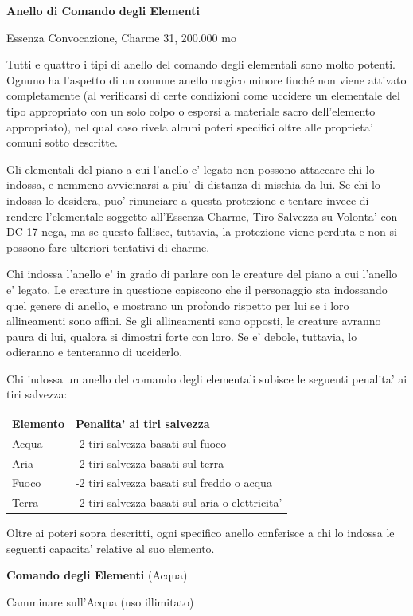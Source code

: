 \documentclass[a4paper,11pt,twoside,openany]{book}
\begin{document}
{\textbf{Anello di Comando degli Elementi}

Essenza Convocazione, Charme 31, 200.000 mo

Tutti e quattro i tipi di anello del comando degli elementali sono molto potenti. Ognuno ha l'aspetto di un comune anello magico minore finché non viene attivato completamente (al verificarsi di certe condizioni come uccidere un elementale del tipo appropriato con un solo colpo o esporsi a materiale sacro dell'elemento appropriato), nel qual caso rivela alcuni poteri specifici oltre alle proprieta' comuni sotto descritte.

Gli elementali del piano a cui l'anello e' legato non possono attaccare chi lo indossa, e nemmeno avvicinarsi a piu' di distanza di mischia da lui. Se chi lo indossa lo desidera, puo' rinunciare a questa protezione e tentare invece di rendere l'elementale soggetto all'Essenza Charme, Tiro Salvezza su Volonta' con DC 17 nega, ma se questo fallisce, tuttavia, la protezione viene perduta e non si possono fare ulteriori tentativi di charme.

Chi indossa l'anello e' in grado di parlare con le creature del piano a cui l'anello e' legato. Le creature in questione capiscono che il personaggio sta indossando quel genere di anello, e mostrano un profondo rispetto per lui se i loro allineamenti sono affini. Se gli allineamenti sono opposti, le creature avranno paura di lui, qualora si dimostri forte con loro. Se e' debole, tuttavia, lo odieranno e tenteranno di ucciderlo.

Chi indossa un anello del comando degli elementali subisce le seguenti
penalita' ai tiri salvezza:

\begin{tabular}{ll}
\toprule
\textbf{Elemento} & \textbf{Penalita' ai tiri salvezza}\tabularnewline
Acqua & -2 tiri salvezza basati sul fuoco\tabularnewline
Aria & -2 tiri salvezza basati sul terra\tabularnewline
Fuoco & -2 tiri salvezza basati sul freddo o acqua\tabularnewline
Terra & -2 tiri salvezza basati sul aria o elettricita'\tabularnewline

\end{tabular}

Oltre ai poteri sopra descritti, ogni specifico anello conferisce
a chi lo indossa le seguenti capacita' relative al suo elemento.

\textbf{Comando degli Elementi} (Acqua)

Camminare sull'Acqua (uso illimitato)

}
\end{document}
